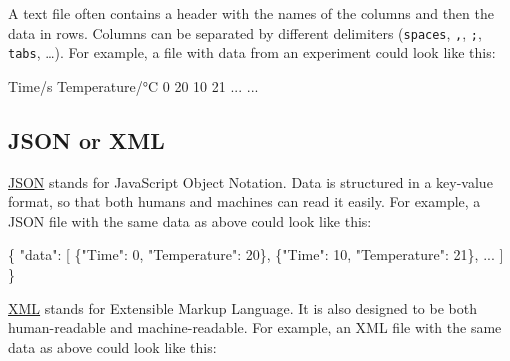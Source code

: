 \documentclass[
  letterpaper,
  DIV=11,
  numbers=noendperiod]{scrreprt}
\newenvironment{Shaded}{\begin{snugshade}}{\end{snugshade}}
\newcommand{\DataTypeTok}[1]{\textcolor[rgb]{0.68,0.00,0.00}{#1}}
\newcommand{\DecValTok}[1]{\textcolor[rgb]{0.68,0.00,0.00}{#1}}
\newcommand{\ErrorTok}[1]{\textcolor[rgb]{0.68,0.00,0.00}{#1}}
\newcommand{\FunctionTok}[1]{\textcolor[rgb]{0.28,0.35,0.67}{#1}}
\newcommand{\NormalTok}[1]{\textcolor[rgb]{0.00,0.23,0.31}{#1}}
\newcommand{\OtherTok}[1]{\textcolor[rgb]{0.00,0.23,0.31}{#1}}
\begin{document}
A text file often contains a header with the names of the columns and
then the data in rows. Columns can be separated by different delimiters
(\texttt{spaces}, \texttt{,}, \texttt{;}, \texttt{tabs}, \ldots). For
example, a file with data from an experiment could look like this:

\begin{Shaded}
\begin{Highlighting}[]
\NormalTok{Time/s  Temperature/°C}
\NormalTok{0         20}
\NormalTok{10        21}
\NormalTok{...     ...}
\end{Highlighting}
\end{Shaded}

\subsection*{JSON or XML}\label{json-or-xml}

\href{https://en.wikipedia.org/wiki/JSON}{JSON} stands for JavaScript
Object Notation. Data is structured in a key-value format, so that both
humans and machines can read it easily. For example, a JSON file with
the same data as above could look like this:

\begin{Shaded}
\begin{Highlighting}[]
\FunctionTok{\{}
  \DataTypeTok{"data"}\FunctionTok{:} \OtherTok{[}
    \FunctionTok{\{}\DataTypeTok{"Time"}\FunctionTok{:} \DecValTok{0}\FunctionTok{,} \DataTypeTok{"Temperature"}\FunctionTok{:} \DecValTok{20}\FunctionTok{\}}\OtherTok{,}
    \FunctionTok{\{}\DataTypeTok{"Time"}\FunctionTok{:} \DecValTok{10}\FunctionTok{,} \DataTypeTok{"Temperature"}\FunctionTok{:} \DecValTok{21}\FunctionTok{\}}\OtherTok{,}
    \ErrorTok{...}
  \OtherTok{]}
\FunctionTok{\}}
\end{Highlighting}
\end{Shaded}

\href{https://en.wikipedia.org/wiki/XML}{XML} stands for Extensible
Markup Language. It is also designed to be both human-readable and
machine-readable. For example, an XML file with the same data as above
could look like this:
\end{document}
